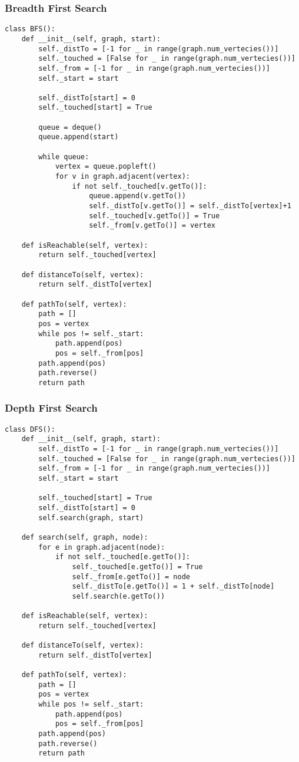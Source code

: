 \documentclass[12pt]{article}
\begin{document}
\subsubsection{Breadth First Search}
\begin{lstlisting}
class BFS():
	def __init__(self, graph, start):
		self._distTo = [-1 for _ in range(graph.num_vertecies())]
		self._touched = [False for _ in range(graph.num_vertecies())]
		self._from = [-1 for _ in range(graph.num_vertecies())]
		self._start = start

		self._distTo[start] = 0
		self._touched[start] = True

		queue = deque()
		queue.append(start)

		while queue:
			vertex = queue.popleft()
			for v in graph.adjacent(vertex):
				if not self._touched[v.getTo()]:
					queue.append(v.getTo())
					self._distTo[v.getTo()] = self._distTo[vertex]+1
					self._touched[v.getTo()] = True
					self._from[v.getTo()] = vertex

	def isReachable(self, vertex):
		return self._touched[vertex]

	def distanceTo(self, vertex):
		return self._distTo[vertex]

	def pathTo(self, vertex):
		path = []
		pos = vertex
		while pos != self._start:
			path.append(pos)
			pos = self._from[pos]
		path.append(pos)
		path.reverse()
		return path
\end{lstlisting}

\subsubsection{Depth First Search}
\begin{lstlisting}
class DFS():
	def __init__(self, graph, start):
		self._distTo = [-1 for _ in range(graph.num_vertecies())]
		self._touched = [False for _ in range(graph.num_vertecies())]
		self._from = [-1 for _ in range(graph.num_vertecies())]
		self._start = start

		self._touched[start] = True
		self._distTo[start] = 0
		self.search(graph, start)

	def search(self, graph, node):
		for e in graph.adjacent(node):
			if not self._touched[e.getTo()]:
				self._touched[e.getTo()] = True
				self._from[e.getTo()] = node
				self._distTo[e.getTo()] = 1 + self._distTo[node]
				self.search(e.getTo())

	def isReachable(self, vertex):
		return self._touched[vertex]

	def distanceTo(self, vertex):
		return self._distTo[vertex]

	def pathTo(self, vertex):
		path = []
		pos = vertex
		while pos != self._start:
			path.append(pos)
			pos = self._from[pos]
		path.append(pos)
		path.reverse()
		return path
\end{lstlisting}
\end{document}
